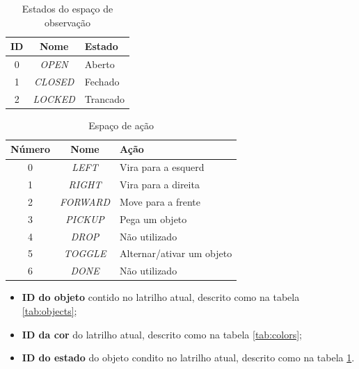 \documentclass[9pt,a4paper,twoside]{tau}
\begin{document}
\begin{table}[htbp]
    \caption{Estados do espaço de observação}
    \label{tab:states}
    \centering
    \begin{tabular}{ccl}
        \toprule
        \textbf{ID} & \textbf{Nome}   & \textbf{Estado} \\
        \midrule
        0           & \textit{OPEN}   & Aberto          \\
        1           & \textit{CLOSED} & Fechado         \\
        2           & \textit{LOCKED} & Trancado        \\
        \bottomrule
    \end{tabular}
\end{table}

\begin{table}[htbp]
    \caption{Espaço de ação}
    \label{tab:actions}
    \centering
    \begin{tabular}{ccl}
        \toprule
        \textbf{Número} & \textbf{Nome}    & \textbf{Ação}             \\
        \midrule
        0               & \textit{LEFT}    & Vira para a esquerd       \\
        1               & \textit{RIGHT}   & Vira para a direita       \\
        2               & \textit{FORWARD} & Move para a frente        \\
        3               & \textit{PICKUP}  & Pega um objeto            \\
        4               & \textit{DROP}    & Não utilizado             \\
        5               & \textit{TOGGLE}  & Alternar/ativar um objeto \\
        6               & \textit{DONE}    & Não utilizado             \\
        \bottomrule
    \end{tabular}
\end{table}

\begin{itemize}
    \item \textbf{ID do objeto} contido no latrilho atual, descrito como na tabela  \ref{tab:objects};
    \item \textbf{ID da cor} do latrilho atual, descrito como na tabela  \ref{tab:colors};
    \item \textbf{ID do estado} do objeto condito no latrilho atual, descrito como na tabela  \ref{tab:states}.
\end{itemize}
\end{document}
